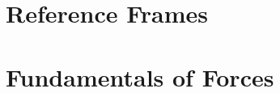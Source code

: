 \documentclass[british,11pt,a4paper]{report}
\begin{document}
\maketitle
\tableofcontents
\chapter{Reference Frames}
\label{chapRefFrames}

\chapter{Fundamentals of Forces}
\label{chapForces}

\end{document}
